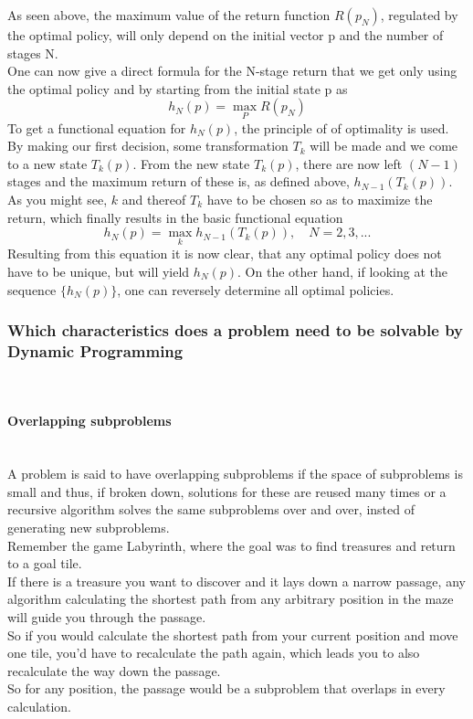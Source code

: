 \documentclass[conference]{IEEEtran}
\begin{document}
As seen above, the maximum value of the return function $R(p_N)$, regulated by the optimal policy, will only depend on the initial vector p and the number of stages N.
\\
One can now give a direct formula for the N-stage return that we get only using the optimal policy and by starting from the initial state p as
\begin{equation}
h_N(p) = \max_P R(p_N)
\end{equation}
To get a functional equation for $h_N(p)$, the principle of of optimality is used. By making our first decision, some transformation $T_k$ will be made and we come to a new state $T_k(p)$.
From the new state $T_k(p)$, there are now left $(N-1)$ stages and the maximum return of these is, as defined above, $h_{N-1}(T_k(p))$. 
\\
As you might see, $k$ and thereof $T_k$ have to be chosen so as to maximize the return, which finally results in the basic functional equation
\begin{equation}
h_N(p) = \max_k h_{N-1}(T_k(p)), \quad N = 2, 3, ...
\end{equation}
Resulting from this equation it is now clear, that any optimal policy does not have to be unique, but will yield $h_N(p)$. On the other hand, if looking at the sequence $\{h_N(p)\}$, one can reversely determine all optimal policies.
\cite{Bellman.30.07.1954}\\
\subsubsection{Which characteristics does a problem need to be solvable by Dynamic Programming}
\quad \\
\paragraph{Overlapping subproblems}
\quad \\
A problem is said to have overlapping subproblems if the space of subproblems is small and thus, if broken down, solutions for these are reused many times or a recursive algorithm solves the same subproblems over and over, insted of generating new subproblems. \cite{Cormen.2007}
\\
Remember the game Labyrinth, where the goal was to find treasures and return to a goal tile.\\
If there is a treasure you want to discover and it lays down a narrow passage, any algorithm calculating the shortest path from any arbitrary position in the maze will guide you through the passage.\\
So if you would calculate the shortest path from your current position and move one tile, you'd have to recalculate the path again, which leads you to also recalculate the way down the passage.\\
So for any position, the passage would be a subproblem that overlaps in every calculation. 
\end{document}
